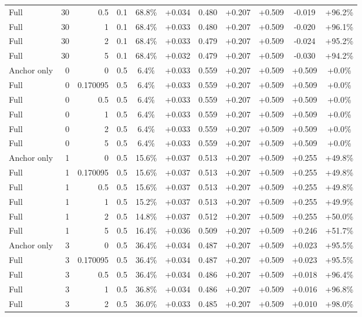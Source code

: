 \begin{table}[htbp]
\begin{tabular}{lrrrccccccc}
Full & 30 & 0.5 & 0.1 & 68.8\% & +0.034 & 0.480 & +0.207 & +0.509 & -0.019 & +96.2\% \\
Full & 30 & 1 & 0.1 & 68.4\% & +0.033 & 0.480 & +0.207 & +0.509 & -0.020 & +96.1\% \\
Full & 30 & 2 & 0.1 & 68.4\% & +0.033 & 0.479 & +0.207 & +0.509 & -0.024 & +95.2\% \\
Full & 30 & 5 & 0.1 & 68.4\% & +0.032 & 0.479 & +0.207 & +0.509 & -0.030 & +94.2\% \\
Anchor only & 0 & 0 & 0.5 & 6.4\% & +0.033 & 0.559 & +0.207 & +0.509 & +0.509 & +0.0\% \\
Full & 0 & 0.170095 & 0.5 & 6.4\% & +0.033 & 0.559 & +0.207 & +0.509 & +0.509 & +0.0\% \\
Full & 0 & 0.5 & 0.5 & 6.4\% & +0.033 & 0.559 & +0.207 & +0.509 & +0.509 & +0.0\% \\
Full & 0 & 1 & 0.5 & 6.4\% & +0.033 & 0.559 & +0.207 & +0.509 & +0.509 & +0.0\% \\
Full & 0 & 2 & 0.5 & 6.4\% & +0.033 & 0.559 & +0.207 & +0.509 & +0.509 & +0.0\% \\
Full & 0 & 5 & 0.5 & 6.4\% & +0.033 & 0.559 & +0.207 & +0.509 & +0.509 & +0.0\% \\
Anchor only & 1 & 0 & 0.5 & 15.6\% & +0.037 & 0.513 & +0.207 & +0.509 & +0.255 & +49.8\% \\
Full & 1 & 0.170095 & 0.5 & 15.6\% & +0.037 & 0.513 & +0.207 & +0.509 & +0.255 & +49.8\% \\
Full & 1 & 0.5 & 0.5 & 15.6\% & +0.037 & 0.513 & +0.207 & +0.509 & +0.255 & +49.8\% \\
Full & 1 & 1 & 0.5 & 15.2\% & +0.037 & 0.513 & +0.207 & +0.509 & +0.255 & +49.9\% \\
Full & 1 & 2 & 0.5 & 14.8\% & +0.037 & 0.512 & +0.207 & +0.509 & +0.255 & +50.0\% \\
Full & 1 & 5 & 0.5 & 16.4\% & +0.036 & 0.509 & +0.207 & +0.509 & +0.246 & +51.7\% \\
Anchor only & 3 & 0 & 0.5 & 36.4\% & +0.034 & 0.487 & +0.207 & +0.509 & +0.023 & +95.5\% \\
Full & 3 & 0.170095 & 0.5 & 36.4\% & +0.034 & 0.487 & +0.207 & +0.509 & +0.023 & +95.5\% \\
Full & 3 & 0.5 & 0.5 & 36.4\% & +0.034 & 0.486 & +0.207 & +0.509 & +0.018 & +96.4\% \\
Full & 3 & 1 & 0.5 & 36.8\% & +0.034 & 0.486 & +0.207 & +0.509 & +0.016 & +96.8\% \\
Full & 3 & 2 & 0.5 & 36.0\% & +0.033 & 0.485 & +0.207 & +0.509 & +0.010 & +98.0\% \\

\end{tabular}
\end{table}
